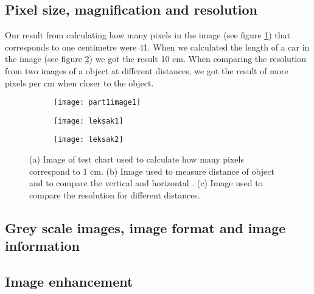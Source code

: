 \subsection{Pixel size, magnification and resolution}
Our result from calculating how many pixels in the image (see figure \ref{fig:TestChart}) that corresponds to one centimetre were 41. When we calculated the length of a car in the image (see figure \ref{fig:Toy1}) we got the result 10 cm. When comparing the resolution from two images of a object at different distances, we got the result of more pixels per cm when closer to the object.

\begin{figure}[h]
	\centering
	\begin{subfigure}[b]{0.3\textwidth}
		\texttt{[image: part1image1]}
		\caption{}
		\label{fig:TestChart}
	\end{subfigure}
	\begin{subfigure}[b]{0.3\textwidth}
		\texttt{[image: leksak1]}
		\caption{}
		\label{fig:Toy1}
	\end{subfigure}
	\begin{subfigure}[b]{0.3\textwidth}
		\texttt{[image: leksak2]}
		\caption{}
		\label{fig:Toy2}
	\end{subfigure}
	\caption{(a) Image of test chart used to calculate how many pixels correspond to 1 cm. (b) Image used to measure distance of object and to compare the vertical and horizontal . (c) Image used to compare the resolution for different distances.}
	\label{fig:part1}
\end{figure}

\subsection{Grey scale images, image format and image information}

\subsection{Image enhancement}


